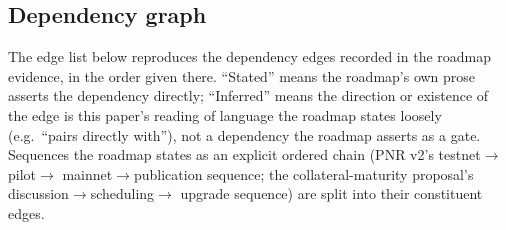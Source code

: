 \subsection{Dependency graph}\label{sec:E3}

The edge list below reproduces the dependency edges recorded in the roadmap evidence, in the
order given there. ``Stated'' means the roadmap's own prose asserts the dependency directly;
``Inferred'' means the direction or existence of the edge is this paper's reading of language the
roadmap states loosely (e.g.\ ``pairs directly with''), not a dependency the roadmap asserts as a
gate. Sequences the roadmap states as an explicit ordered chain (PNR v2's testnet$\to$pilot$\to$
mainnet$\to$publication sequence; the collateral-maturity proposal's discussion$\to$scheduling$\to$
upgrade sequence) are split into their constituent edges.

